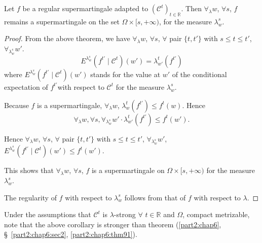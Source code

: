 \begin{corollary}\label{part2:chap7:coro112}
Let $f$ be a regular supermartingale adapted to $(\mathscr{C}^t)_{t
  \in \mathbb{R}}$. Then $\forall_\lambda w$, $\forall s$, $f$ remains
a supermartingale on the set $\Omega \times [s,+\infty)$, for the
  measure $\lambda^s_w$. 
\end{corollary}

\begin{proof}
From the above theorem, we have $\forall_\lambda w$, $\forall s$,
$\forall$ pair $\{t,t'\}$ with $s \leq t \leq t'$,
$\forall_{\lambda^s_w} w'$.
$$
E^{\lambda^s_w} (f^{t'} \mid \mathscr{C}^t) (w') = \lambda^t_{w'}
(f^{t'}) 
$$
where $E^{\lambda^s_w} (f^{t'} \mid \mathscr{C}^t)(w')$ stands for the
value at $w'$ of the conditional expectation  of
$f^{t'}$\pageoriginale with respect to $\mathscr{C}^t$ for the measure
$\lambda^s_w$.

Because $f$ is a supermartingale, $\forall_\lambda w$,
$\lambda^t_w(f^{t'}) \leq f^t(w)$. Hence
$$
\forall_\lambda w, \forall s, \forall_{\lambda^s_w} w' \cdot
\lambda^t_{w'} (f^{t'}) \leq f^t(w'). 
$$

Hence $\forall_\lambda w$, $\forall s$, $\forall$ pair $\{t,t'\}$ with
$s \leq t \leq t'$, $\forall_{\lambda^s_w} w'$, $E^{\lambda^s_w}
(f^{t'} \mid \mathscr{C}^t) (w') \leq f^t (w')$. 

This shows that $\forall_\lambda w$, $\forall s$, $f$ is a
supermartingale on $\Omega \times [s, + \infty)$ for the measure
  $\lambda^s_w$. 

The regularity of $f$ with respect to $\lambda^s_w$ follows from that
of $f$ with respect to $\lambda$.
\end{proof}

\begin{rem}\label{part2:chap7:rem113}
Under the assumptions that $\mathscr{C}^t$ is $\lambda$-strong
$\forall$ $t \in \mathbb{R}$ and $\Omega$, compact metrizable, note
that the above corollary is stronger than theorem (\ref{part2:chap6},
\S\ \ref{part2:chap6:sec2}, \ref{part2:chap6:thm91}).  
\end{rem}


